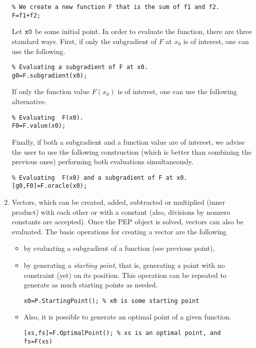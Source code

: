 \documentclass[11pt,a4paper]{article}
\begin{document}
\begin{enumerate}
\begin{lstlisting}
% We create a new function F that is the sum of f1 and f2.
F=f1+f2;
		\end{lstlisting}
		Let $\verb?x0?$ be some initial point. In order to evaluate the function, there are three standard ways. First, if only the subgradient of $F$ at $x_0$ is of interest, one can use the following.\\[-1cm]
		\begin{lstlisting}
% Evaluating a subgradient of F at x0.
g0=F.subgradient(x0);
		\end{lstlisting} If only the function value $F(x_0)$ is of interest, one can use the following alternative.\\[-1cm]
		\begin{lstlisting}
% Evaluating  F(x0).
F0=F.value(x0);
		\end{lstlisting} Finally, if both a subgradient and a function value are of interest, we advise the user to use the following construction (which is better than combining the previous ones) performing both evaluations simultaneously.\\[-1cm]
		\begin{lstlisting}
% Evaluating  F(x0) and a subgradient of F at x0.
[g0,F0]=F.oracle(x0);
		\end{lstlisting}
		\item Vectors, which can be created, added, subtracted or multiplied (inner product) with each other or with a constant (also, divisions by nonzero constants are accepted). Once the PEP object is solved, vectors can also be evaluated. The basic operations for creating a vector are the following
		\begin{itemize}
			\item by evaluating a subgradient of a function (see previous point),
			\item by generating a \emph{starting point}, that is, generating a point with no constraint (yet) on its position. This operation can be repeated to generate as much starting points as needed.\\[-1cm]
			\begin{lstlisting}
x0=P.StartingPoint(); % x0 is some starting point
			\end{lstlisting}
			\item Also, it is possible to generate an optimal point of a given function.\\[-1cm]
			\begin{lstlisting}
[xs,fs]=F.OptimalPoint(); % xs is an optimal point, and fs=F(xs)
			\end{lstlisting}

\end{itemize}
\end{enumerate}
\end{document}

